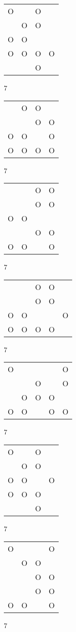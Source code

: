 \begin{tabular}{|m{0.2cm}m{0.2cm}m{0.2cm}m{0.2cm}|}\hline
O& &O& \\
 &O&O& \\
O&O& & \\
O&O&O&O\\
 & &O& \\
\hline\end{tabular}7
\begin{tabular}{|m{0.2cm}m{0.2cm}m{0.2cm}m{0.2cm}|}\hline
 &O&O& \\
 & &O&O\\
O&O& &O\\
O&O&O&O\\
\hline\end{tabular}7
\begin{tabular}{|m{0.2cm}m{0.2cm}m{0.2cm}m{0.2cm}|}\hline
 & &O&O\\
 & &O&O\\
O&O& & \\
 & &O&O\\
O&O& &O\\
\hline\end{tabular}7
\begin{tabular}{|m{0.2cm}m{0.2cm}m{0.2cm}m{0.2cm}m{0.2cm}|}\hline
 & &O&O& \\
 & &O&O& \\
O&O& & &O\\
O&O&O&O& \\
\hline\end{tabular}7
\begin{tabular}{|m{0.2cm}m{0.2cm}m{0.2cm}m{0.2cm}m{0.2cm}|}\hline
O& & & &O\\
 & &O& &O\\
 &O&O&O& \\
O&O& &O&O\\
\hline\end{tabular}7
\begin{tabular}{|m{0.2cm}m{0.2cm}m{0.2cm}m{0.2cm}|}\hline
O& &O& \\
 &O&O& \\
O&O& &O\\
O&O&O& \\
 & &O& \\
\hline\end{tabular}7
\begin{tabular}{|m{0.2cm}m{0.2cm}m{0.2cm}m{0.2cm}|}\hline
O& & &O\\
 &O&O& \\
 & &O&O\\
 & &O&O\\
O&O& &O\\
\hline\end{tabular}7
